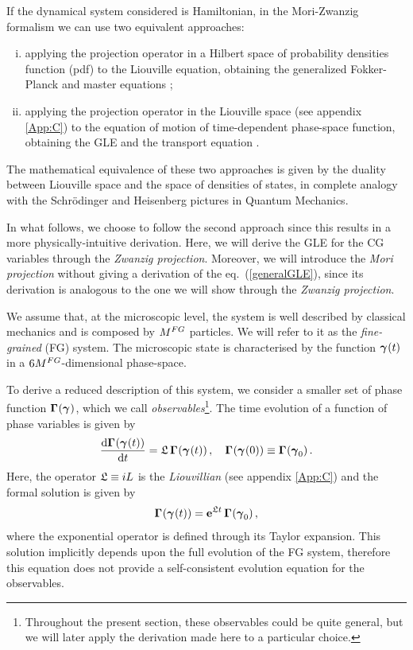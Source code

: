 \documentclass[10pt,a4paper]{book}
\theoremstyle{definition}
\begin{document}
If the dynamical system considered is Hamiltonian, in the Mori-Zwanzig formalism we can use two equivalent approaches:
\begin{enumerate}[(i)]
  \item applying the projection operator in a Hilbert space of probability densities function (pdf) to the Liouville equation, obtaining the generalized Fokker-Planck and master equations \cite{Kinjo2007,Zwanzig1960,Zwanzig1961,Zwanzig1964};
  \item applying the projection operator in the Liouville space (see appendix \ref{App:C}) to the equation of motion of time-dependent phase-space function, obtaining the GLE and the transport equation \cite{DiPasquale2019,Hijon2010,Mori1965,Nordholm1975,Zwanzig1973}.
\end{enumerate}
The mathematical equivalence of these two approaches is given by the duality between Liouville space and the space of densities of states, in complete analogy with the Schr\"odinger and Heisenberg pictures in Quantum Mechanics. 

\noindent
In what follows, we choose to follow the second approach since this results in a more physically-intuitive derivation.
Here, we will derive the GLE for the CG variables through the \emph{Zwanzig projection}. Moreover, we will introduce the \emph{Mori projection} without giving a derivation of the eq.~(\ref{generalGLE}), since its derivation is analogous to the one we will show through the \emph{Zwanzig projection}.

We assume that, at the microscopic level, the system is well described by classical mechanics and is composed by $M^{FG}$ particles. We will refer to it as the \emph{fine-grained} (FG) system. The microscopic state is characterised by the function $\boldsymbol\gamma_{}(t)$ in a $6M^{FG}$-dimensional phase-space. 

\noindent
To derive a reduced description of this system, we consider a smaller set of phase function $\boldsymbol\Gamma_{}(\boldsymbol\gamma_{})$, which we call \emph{observables}\footnote{
Throughout the present section, these observables could be quite general, but we will later apply the derivation made here to a particular choice.
}.
The time evolution of a function of phase variables is given by
\begin{equation}\label{Eq:MotionEqGamma}
  \frac{\mbox{d}\boldsymbol\Gamma_{}(\boldsymbol\gamma_{}(t))}{\mbox{d}t} = \mathfrak{L}\,\boldsymbol\Gamma_{}(\boldsymbol\gamma_{}(t))\,,
  \quad\boldsymbol\Gamma_{}(\boldsymbol\gamma_{}(0)) \equiv \boldsymbol\Gamma_{}(\boldsymbol\gamma_{0})\,.
\end{equation}
Here, the operator $\mathfrak{L}\equiv iL$ is the \emph{Liouvillian} (see appendix \ref{App:C}) and the formal solution is given by
\begin{equation}\label{Eq:SolLiouville}
	\boldsymbol\Gamma_{}(\boldsymbol\gamma_{}(t)) = \mathbf{e}^{\mathfrak{L} t}\,\boldsymbol\Gamma_{}(\boldsymbol\gamma_{0})\,,
\end{equation}
where the exponential operator is defined through its Taylor expansion.
This solution implicitly depends upon the full evolution of the FG system, therefore this equation does not provide a self-consistent evolution equation for the observables. 
\end{document}
